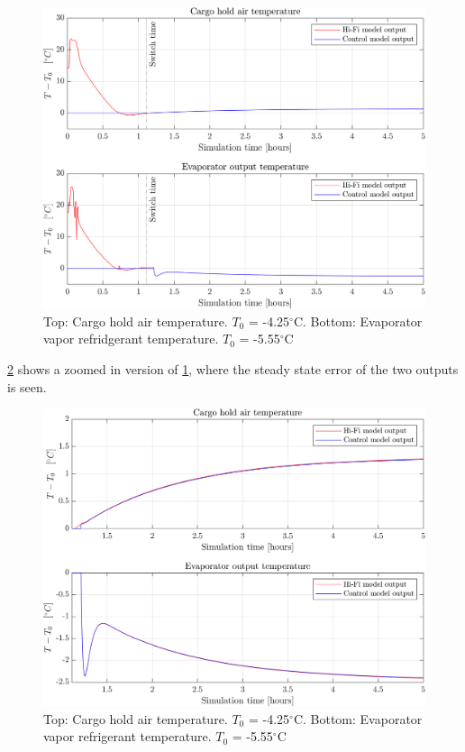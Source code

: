 \begin{figure}[h!]
	\centering
	\includegraphics[width=1\textwidth]{Graphics/fig_LQR_wellTuned_5stepDist.png}
	\caption{Top: Cargo hold air temperature. $T_0$ = -4.25$^{\circ}$C. Bottom: Evaporator vapor refridgerant temperature. $T_0$ = -5.55$^{\circ}$C}
	\label{fig:LQR_wellTuned_5stepDist}
\end{figure}

\cref{fig:LQR_wellTuned_5stepDist_zoom} shows a zoomed in version of \cref{fig:LQR_wellTuned_5stepDist}, where the steady state error of the two outputs is seen.\\

\begin{figure}[h!]
	\centering
	\includegraphics[width=1\textwidth]{Graphics/fig_LQR_wellTuned_5stepDist_zoom.png}
	\caption{Top: Cargo hold air temperature. $T_0$ = -4.25$^{\circ}$C. Bottom: Evaporator vapor refrigerant temperature. $T_0$ = -5.55$^{\circ}$C}
	\label{fig:LQR_wellTuned_5stepDist_zoom}
\end{figure}

